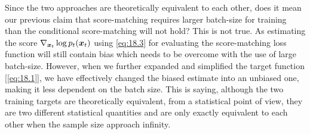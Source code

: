 Since the two approaches are theoretically equivalent to each other, does it mean our previous claim that score-matching requires larger batch-size for training than the conditional score-matching  will not hold? This is not true. As estimating the score $\nabla_{\bm{x}_{t}}\log p_{t}(\bm{x}_{t})$ using \cref{eq:18.3} for evaluating the score-matching loss function will still contain bias which needs to be overcome with the use of large batch-size. However, when we further expanded and simplified the target function [\cref{eq:18.1}], we have effectively changed the biased estimate into an unbiased one, making it less dependent on the batch size. This is saying, although the two training targets are theoretically equivalent, from a statistical point of view, they are two different statistical quantities and are only exactly equivalent to each other when the sample size approach infinity.
